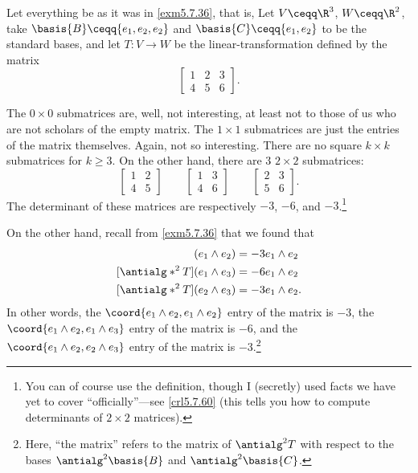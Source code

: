 \begin{exm}{}{}
	Let everything be as it was in \cref{exm5.7.36}, that is, Let $V\ceqq \R ^3$, $W\ceqq \R ^2$, take $\basis{B}\ceqq \{ e_1,e_2,e_2\}$ and $\basis{C}\ceqq \{ e_1,e_2\}$ to be the standard bases, and let $T\colon V\rightarrow W$ be the linear-transformation defined by the matrix
	\begin{equation}\label{eqn5.7.45}
		\begin{bmatrix}1 & 2 & 3 \\ 4 & 5 & 6\end{bmatrix}.
	\end{equation}
	
	The $0\times 0$ submatrices are, well, not interesting, at least not to those of us who are not scholars of the empty matrix.  The $1\times 1$ submatrices are just the entries of the matrix themselves.  Again, not so interesting.  There are no square $k\times k$ submatrices for $k\geq 3$.  On the other hand, there are $3$ $2\times 2$ submatrices:
	\begin{equation}\label{eqn5.7.46}
		\begin{bmatrix}1 & 2 \\ 4 & 5\end{bmatrix}\qquad \begin{bmatrix}1 & 3 \\ 4 & 6\end{bmatrix}\qquad \begin{bmatrix}2 & 3 \\ 5 & 6\end{bmatrix}.
	\end{equation}
	The determinant of these matrices are respectively $-3$, $-6$, and $-3$.\footnote{You can of course use the definition, though I (secretly) used facts we have yet to cover ``officially''---see \cref{crl5.7.60} (this tells you how to compute determinants of $2\times 2$ matrices).}
	
	On the other hand, recall from \cref{exm5.7.36} that we found that
	\begin{align}
		[\antialg* ^2T](e_1\wedge e_2) & =-3e_1\wedge e_2 \\
		[\antialg* ^2T](e_1\wedge e_3) & =-6e_1\wedge e_2 \\
		[\antialg* ^2T](e_2\wedge e_3) & =-3e_1\wedge e_2.
	\end{align}
	In other words, the $\coord{e_1\wedge e_2,e_1\wedge e_2}$ entry of the matrix is $-3$, the $\coord{e_1\wedge e_2,e_1\wedge e_3}$ entry of the matrix is $-6$, and the $\coord{e_1\wedge e_2,e_2\wedge e_3}$ entry of the matrix is $-3$.\footnote{Here, ``the matrix'' refers to the matrix of $\antialg ^2T$ with respect to the bases $\antialg ^2\basis{B}$ and $\antialg ^2\basis{C}$.}
	

\end{exm}
